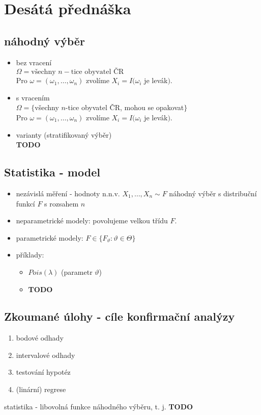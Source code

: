 \documentclass[../main.tex]{subfiles}
\begin{document}
\section{Desátá přednáška}

\subsection{náhodný výběr}
\begin{itemize}
    \item bez vracení \\
    $\Omega = {\text{všechny }n-\text{tice obyvatel ČR}}$\\
    Pro $\omega = (\omega_1,\dots, \omega_n)$ zvolíme $X_i = I(\omega_i$ je levák$)$.
    \item s vracením \\
    $\Omega = \{$všechny $n$-tice obyvatel ČR, mohou se opakovat$\}$\\
    Pro $\omega = (\omega_1,\dots,\omega_n)$ zvolíme $X_i = I(\omega_i$ je levák$)$.
    \item varianty (stratifikovaný výběr)\\
    \textbf{TODO}
\end{itemize}

\subsection{Statistika - model}
\begin{itemize}
    \item nezávislá měření - hodnoty n.n.v. $X_1,\dots,X_n \sim F$ náhodný výběr s distribuční funkcí $F$ s rozsahem $n$
    \item neparametrické modely: povolujeme velkou třídu $F$.
    \item parametrické modely: $F \in \{F_\vartheta: \vartheta \in \Theta\}$
    \item příklady:
    \begin{itemize}
        \item $Pois(\lambda)$ (parametr $\vartheta$)
        \item \textbf{TODO}
    \end{itemize}
\end{itemize}
\subsection{Zkoumané úlohy - cíle konfirmační analýzy}
\begin{enumerate}
    \item bodové odhady
    \item intervalové odhady
    \item testování hypotéz
    \item (linární) regrese
\end{enumerate}
\begin{definition}
    statistika - libovolná funkce náhodného výběru, t. j. \textbf{TODO}
\end{definition}
\end{document}
